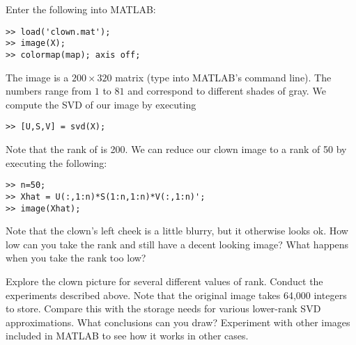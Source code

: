 \begin{matlab}
 Enter the following into MATLAB:
\begin{lstlisting}[style=matlab]
>> load('clown.mat');
>> image(X);
>> colormap(map); axis off;
\end{lstlisting}
The image  is a $200\times 320$ matrix (type 
into MATLAB's command line).  The numbers range from $1$ to $81$ and
correspond to different shades of gray.  We compute the SVD of our
image  by executing
\begin{lstlisting}[style=matlab]
>> [U,S,V] = svd(X);
\end{lstlisting}
Note that the rank of  is 200.  We can reduce our clown image
to a rank of 50 by executing the following:
\begin{lstlisting}[style=matlab]
>> n=50;
>> Xhat = U(:,1:n)*S(1:n,1:n)*V(:,1:n)';
>> image(Xhat);
\end{lstlisting}
Note that the clown's left cheek is a little blurry, but it
otherwise looks ok.  How low can you take the rank and still have a
decent looking image?  What happens when you take the rank too low?

\begin{problem}
Explore the clown picture for several different values of rank.
Conduct the experiments described above.  Note that the original
image takes 64,000 integers to store.  Compare this with the storage
needs for various lower-rank SVD approximations. What conclusions
can you draw? Experiment with other images included in MATLAB to see how it works in other cases.
\end{problem}
\end{matlab}
